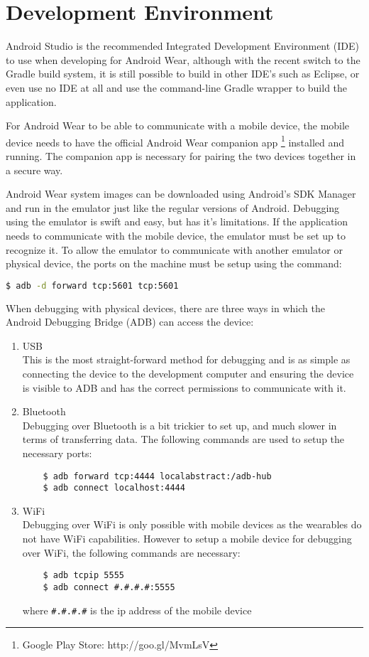 \section{Development Environment}
Android Studio is the recommended Integrated Development Environment (IDE) to
use when developing for Android Wear, although with the recent switch to the
Gradle build system, it is still possible to build in other IDE's such as
Eclipse, or even use no IDE at all and use the command-line Gradle wrapper to
build the application.

For Android Wear to be able to communicate with a mobile device, the mobile
device needs to have the official Android Wear companion app
\footnote{Google Play Store: http://goo.gl/MvmLsV}
installed and running. The companion app is necessary for pairing the two
devices together in a secure way.

Android Wear system images can be downloaded using Android's SDK Manager and run
in the emulator just like the regular versions of Android. Debugging using the
emulator is swift and easy, but has it's limitations. If the application needs
to communicate with the mobile device, the emulator must be set up to recognize
it. To allow the emulator to communicate with another emulator or physical
device, the ports on the machine must be setup using the command:
\begin{lstlisting}[language=Bash]
$ adb -d forward tcp:5601 tcp:5601
\end{lstlisting}

When debugging with physical devices, there are three ways in which the Android
Debugging Bridge (ADB) can access the device:

\begin{enumerate}

\item USB\\
    This is the most straight-forward method for debugging and is as simple as
    connecting the device to the development computer and ensuring the device is
    visible to ADB and has the correct permissions to communicate with it.
\item Bluetooth\\
    Debugging over Bluetooth is a bit trickier to set up, and much slower in
    terms of transferring data. The following commands are used to setup the
    necessary ports:
    \begin{lstlisting}
    $ adb forward tcp:4444 localabstract:/adb-hub
    $ adb connect localhost:4444
    \end{lstlisting}
\item WiFi\\
    Debugging over WiFi is only possible with mobile devices as the wearables
    do not have WiFi capabilities. However to setup a mobile device for
    debugging over WiFi, the following commands are necessary:
    \begin{lstlisting}
    $ adb tcpip 5555
    $ adb connect #.#.#.#:5555
    \end{lstlisting}
    where \texttt{\#.\#.\#.\#} is the ip address of the mobile device
\end{enumerate}
